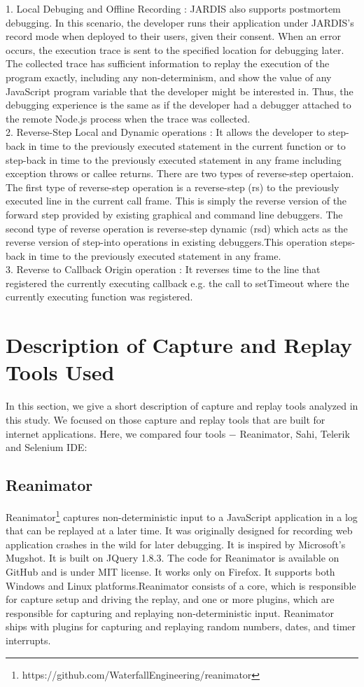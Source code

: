 \documentclass[12pt,journal]{IEEEtran}
\begin{document}
1.	Local Debuging and Offline Recording :  JARDIS also supports postmortem debugging. In this scenario, the developer runs their application under JARDIS’s record mode when deployed to their users, given their consent. When an error occurs, the execution trace is sent to the specified location for debugging later. The collected trace has sufficient information to replay the execution of the program exactly, including any non-determinism, and show the value of any JavaScript program variable that the developer might be interested in. Thus, the debugging experience is the same as if the developer had a debugger attached to the remote Node.js process when the trace was collected.\\
2.	Reverse-Step Local and Dynamic operations : It allows the developer to step-back in time to the previously executed statement in the current function or to step-back in time to the previously executed statement in any frame including exception throws or callee returns.  There are two types of reverse-step opertaion. The first type of reverse-step operation is a reverse-step (rs) to the previously executed line in the current call frame. This is simply the reverse version of the forward step provided by existing graphical and command line debuggers. The second type of reverse operation is reverse-step dynamic (rsd) which acts as the reverse version of step-into operations in existing debuggers.This operation steps-back in time to the previously executed statement in any frame.\\
3.	Reverse to Callback Origin operation : It reverses time to the line that registered the currently executing callback e.g. the call to setTimeout where the currently executing function was registered. 



\section{Description of Capture and Replay Tools Used}
In this section, we give a short description of capture and replay tools analyzed in this study. We focused on those capture and replay tools that are built for internet applications. Here, we compared four tools $-$ Reanimator, Sahi, Telerik and Selenium IDE:
\subsection{Reanimator}
Reanimator\footnote{https://github.com/WaterfallEngineering/reanimator} captures non-deterministic input to a JavaScript application in a log that can be replayed at a later time. It was originally designed for recording web application crashes in the wild for later debugging. It is inspired by Microsoft’s Mugshot. It is built on JQuery 1.8.3. The code for Reanimator is available on GitHub and is under MIT license. It works only on Firefox. It supports both Windows and Linux platforms.Reanimator consists of a core, which is responsible for capture setup and driving the replay, and one or more plugins, which are responsible for capturing and replaying non-deterministic input. Reanimator ships with plugins for capturing and replaying random numbers, dates, and timer interrupts.
\end{document}

